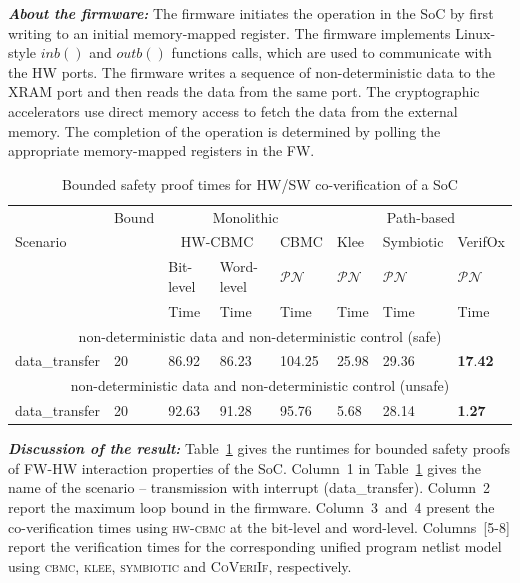 \documentclass[sigconf]{acmart}
\newcommand{\tool}[1]{\textsc{#1}\xspace}
\newcommand{\cbmcv}{\tool{cbmc}}
\newcommand{\hwcbmcv}{\tool{hw-cbmc}}
\newcommand{\verifox}{\tool{CoVeriIf}}
\newcommand{\klee}{\tool{klee}}
\begin{document}
\textbf{\emph{About the firmware:}}
%
The firmware initiates the operation in the SoC by first writing to an
initial memory-mapped register.  The firmware implements Linux-style $inb()$
and $outb()$ functions calls, which are used to communicate with the HW
ports.  The firmware writes a sequence of non-deterministic data to the XRAM
port and then reads the data from the same port.  The cryptographic
accelerators use direct memory access to fetch the data from the external
memory.  The completion of the operation is determined by polling the
appropriate memory-mapped registers in the FW.

\begin{table}
\begin{center}
{
\begin{tabular}{|l|l|l|l|l|l|l|l|}
\hline
  & Bound & \multicolumn{3}{c|}{Monolithic} & \multicolumn{3}{c|}{Path-based} \\ 
\cline{3-8}
 Scenario &  & \multicolumn{2}{c|}{HW-CBMC} & CBMC & Klee & Symbiotic & VerifOx \\ 
\cline{3-8}
      &       &  Bit-level & Word-level & $\mathcal{PN}$ & $\mathcal{PN}$ & $\mathcal{PN}$ & $\mathcal{PN}$ \\
\cline{1-8}
      &       &   Time     &   Time      & Time  &  Time & Time & Time \\
\cline{1-8}      
\multicolumn{8}{|c|}{non-deterministic data and non-deterministic control (safe)} \\ \hline
data\_transfer & 20 & 86.92 & 86.23 & 104.25 & 25.98 & 29.36 &
\textbf{17}.\textbf{42} \\ 
\hline
\multicolumn{8}{|c|}{non-deterministic data and non-deterministic control
(unsafe)} \\ \hline
data\_transfer & 20 & 92.63 & 91.28 & 95.76 & 5.68 & 28.14 &
\textbf{1}.\textbf{27} \\ 
\hline
\end{tabular}
}
\end{center}
\vspace{-1.3mm}
\caption{Bounded safety proof times for HW/SW co-verification of a SoC 
\label{table:SoC}}
\end{table}

\textbf{\emph{Discussion of the result:}}
%
Table~\ref{table:SoC} gives the runtimes for bounded safety proofs of 
FW-HW interaction properties of the SoC.  Column~1 in
Table~\ref{table:SoC} gives the name of the scenario -- transmission with
interrupt (data\_transfer).  Column~2 report the maximum loop bound in the
firmware.  Column~3~and~4 present the co-verification times using \hwcbmcv
at the bit-level and word-level.  Columns~[5-8] report the
verification times for the corresponding unified program netlist model using
\cbmcv, \klee, \textsc{symbiotic} and \verifox, respectively.  
\end{document}
